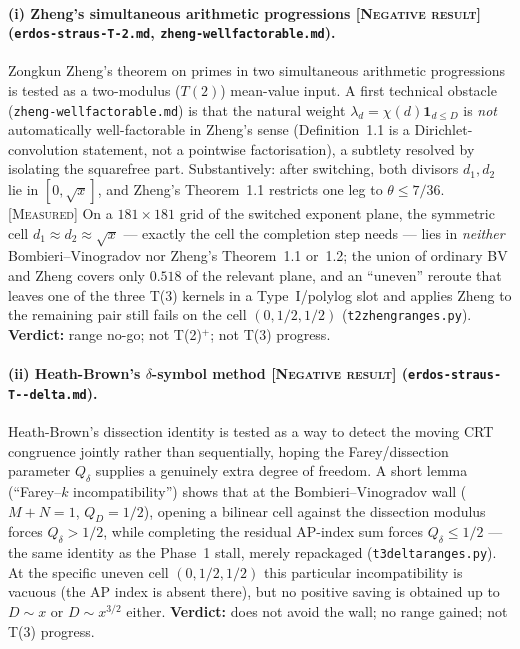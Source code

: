 \documentclass[11pt]{article}
\theoremstyle{plain}
\theoremstyle{definition}
\theoremstyle{remark}
\newcommand{\NEGATIVE}{\textcolor{negative}{\textsc{[Negative result]}}}
\newcommand{\MEASURED}{\textcolor{claimed}{\textsc{[Measured]}}}
\newcommand{\file}[1]{\texttt{#1}}
\renewcommand{\_}{\textunderscore\allowbreak}
\begin{document}
\paragraph{(i) Zheng's simultaneous arithmetic progressions \NEGATIVE{} (\file{erdos-straus-T-2.md}, \texttt{zheng-\allowbreak wellfactorable.md}).}
Zongkun Zheng's theorem on primes in two simultaneous arithmetic progressions
\cite{Zheng2025} is tested as a two-modulus ($T(2)$) mean-value input. A first technical
obstacle (\texttt{zheng-\allowbreak wellfactorable.md}) is that the natural weight
$\lambda_d=\chi(d)\mathbf 1_{d\le D}$ is \emph{not} automatically well-factorable in Zheng's
sense (Definition~1.1 is a Dirichlet-convolution statement, not a pointwise factorisation), a
subtlety resolved by isolating the squarefree part. Substantively: after switching, both
divisors $d_1,d_2$ lie in $[0,\sqrt x]$, and Zheng's Theorem~1.1 restricts one leg to
$\theta\le7/36$. \MEASURED{} On a $181\times181$ grid of the switched exponent plane, the
symmetric cell $d_1\approx d_2\approx\sqrt x$ — exactly the cell the completion step needs — lies
in \emph{neither} Bombieri--Vinogradov nor Zheng's Theorem~1.1 or~1.2; the union of ordinary BV
and Zheng covers only $0.518$ of the relevant plane, and an ``uneven'' reroute that leaves one
of the three T(3) kernels in a Type~I/polylog slot and applies Zheng to the remaining pair still
fails on the cell $(0,1/2,1/2)$ (\file{t2\_zheng\_ranges.py}). \textbf{Verdict:} range no-go;
not T(2)$^+$; not T(3) progress.

\paragraph{(ii) Heath-Brown's $\delta$-symbol method \NEGATIVE{} (\texttt{erdos-\allowbreak straus-\allowbreak T--\allowbreak delta.md}).}
Heath-Brown's dissection identity \cite{HeathBrown1996} is tested as a way to detect the moving
CRT congruence jointly rather than sequentially, hoping the Farey/dissection parameter
$Q_\delta$ supplies a genuinely extra degree of freedom. A short lemma
(``Farey--$k$ incompatibility'') shows that at the Bombieri--Vinogradov wall ($M+N=1$,
$Q_D=1/2$), opening a bilinear cell against the dissection modulus forces $Q_\delta>1/2$, while
completing the residual AP-index sum forces $Q_\delta\le1/2$ — the same identity as the Phase~1
stall, merely repackaged (\file{t3\_delta\_ranges.py}). At the specific uneven cell
$(0,1/2,1/2)$ this particular incompatibility is vacuous (the AP index is absent there), but no
positive saving is obtained up to $D\sim x$ or $D\sim x^{3/2}$ either. \textbf{Verdict:} does not
avoid the wall; no range gained; not T(3) progress.
\end{document}
